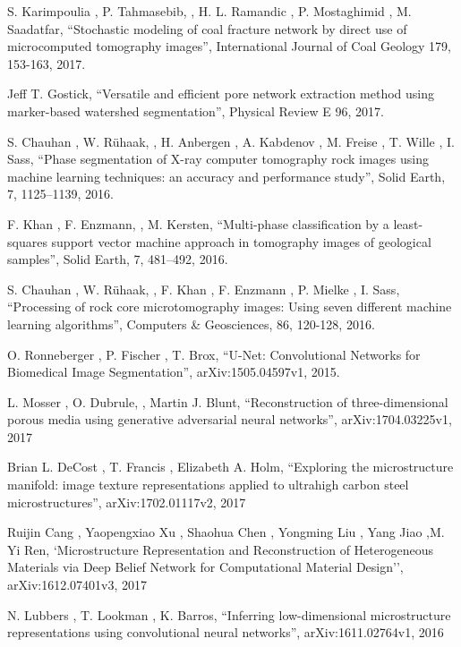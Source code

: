 \documentclass[14pt, a4paper, oneside, bold]{extarticle}
\begin{document}
\begin{thebibliography}{99}

 S. Karimpoulia
	, P. Tahmasebib,
	, H. L. Ramandic
	, P. Mostaghimid
	, M. Saadatfar, 
	``Stochastic modeling of coal fracture network by direct use of microcomputed
tomography images'', International Journal of Coal Geology 179, 153-163, 2017.

 Jeff T. Gostick, 
	``Versatile and efficient pore network extraction method using marker-based watershed segmentation'', Physical Review E 96, 2017.

 S. Chauhan
	, W. Rühaak,
	, H. Anbergen
	, A. Kabdenov
	, M. Freise
	, T. Wille
	, I. Sass,
	``Phase segmentation of X-ray computer tomography rock images
using machine learning techniques: an accuracy
and performance study'', Solid Earth, 7, 1125–1139, 2016.
	
 F. Khan
	, F. Enzmann,
	, M. Kersten, 
	``Multi-phase classification by a least-squares support vector machine
approach in tomography images of geological samples'', Solid Earth, 7, 481–492, 2016.

 S. Chauhan
	, W. Rühaak,
	, F. Khan
	, F. Enzmann
	, P. Mielke
	, I. Sass,
	``Processing of rock core microtomography images: Using seven
different machine learning algorithms'', Computers \& Geosciences, 86, 120-128, 2016.

 O. Ronneberger
	, P. Fischer
	, T. Brox,
	``U-Net: Convolutional Networks for Biomedical
Image Segmentation'', arXiv:1505.04597v1, 2015.

 L. Mosser
	, O. Dubrule,
	, Martin J. Blunt, 
	``Reconstruction of three-dimensional porous media
using generative adversarial neural networks'', 
arXiv:1704.03225v1, 2017

 Brian L. DeCost
	, T. Francis
	, Elizabeth A. Holm, 
	``Exploring the microstructure manifold: image
texture representations applied to ultrahigh 
carbon steel microstructures'', 
arXiv:1702.01117v2, 2017

 Ruijin Cang
	, Yaopengxiao Xu
	, Shaohua Chen
	, Yongming Liu
	, Yang Jiao
	,M. Yi Ren,
	`Microstructure Representation and
Reconstruction of Heterogeneous Materials via
Deep Belief Network for Computational Material 
Design'', 
arXiv:1612.07401v3, 2017

 N. Lubbers
	, T. Lookman
	, K. Barros,
	``Inferring low-dimensional microstructure representations using
convolutional neural networks'', 
arXiv:1611.02764v1, 2016


\end{thebibliography}
\end{document}
